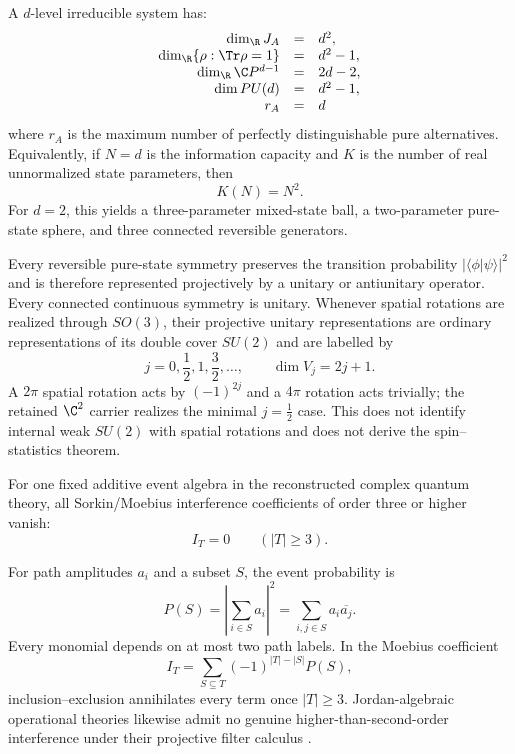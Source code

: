 \begin{corollary}
\label{cor:rd-parameter-counts}
A $d$-level irreducible system has:
\[
 \begin{array}{rcl}
 \dim_\R J_A &=& d^2,\\
 \dim_\R\{\rho:\Tr\rho=1\} &=& d^2-1,\\
 \dim_\R \C P^{d-1} &=& 2d-2,\\
 \dim PU(d) &=& d^2-1,\\
 r_A &=& d
 \end{array}
\]
where $r_A$ is the maximum number of perfectly distinguishable pure alternatives.
Equivalently, if $N=d$ is the information capacity and $K$ is the number of real
unnormalized state parameters, then
\[
 \boxed{K(N)=N^2.}
\]
For $d=2$, this yields a three-parameter mixed-state ball, a two-parameter pure-state
sphere, and three connected reversible generators.
\end{corollary}

\begin{corollary}
Every reversible pure-state symmetry preserves the transition probability
$|\langle\phi|\psi\rangle|^2$ and is therefore represented projectively by a unitary
or antiunitary operator.  Every connected continuous symmetry is unitary.  Whenever
spatial rotations are realized through $SO(3)$, their projective unitary
representations are ordinary representations of its double cover $SU(2)$ and are
labelled by
\[
 j=0,\frac12,1,\frac32,\ldots,
 \qquad \dim V_j=2j+1.
\]
A $2\pi$ spatial rotation acts by $(-1)^{2j}$ and a $4\pi$ rotation acts trivially;
the retained $\C^2$ carrier realizes the minimal $j=\tfrac12$ case.  This does not
identify internal weak $SU(2)$ with spatial rotations and does not derive the
spin--statistics theorem.
\end{corollary}

\begin{theorem}
\label{thm:rd-no-higher-interference}
For one fixed additive event algebra in the reconstructed complex quantum theory,
all Sorkin/Moebius interference coefficients of order three or higher vanish:
\[
 \boxed{I_T=0\qquad(|T|\ge3).}
\]
\end{theorem}

\begin{proofsketch}
For path amplitudes $a_i$ and a subset $S$, the event probability is
\[
 P(S)=\left|\sum_{i\in S}a_i\right|^2
 =\sum_{i,j\in S}a_i\overline{a_j}.
\]
Every monomial depends on at most two path labels.  In the Moebius coefficient
\[
 I_T=\sum_{S\subseteq T}(-1)^{|T|-|S|}P(S),
\]
inclusion--exclusion annihilates every term once $|T|\ge3$.  Jordan-algebraic
operational theories likewise admit no genuine higher-than-second-order
interference under their projective filter calculus
\cite{barnum-hilgert-jordan,barnum-muller-ududec}.
\end{proofsketch}

